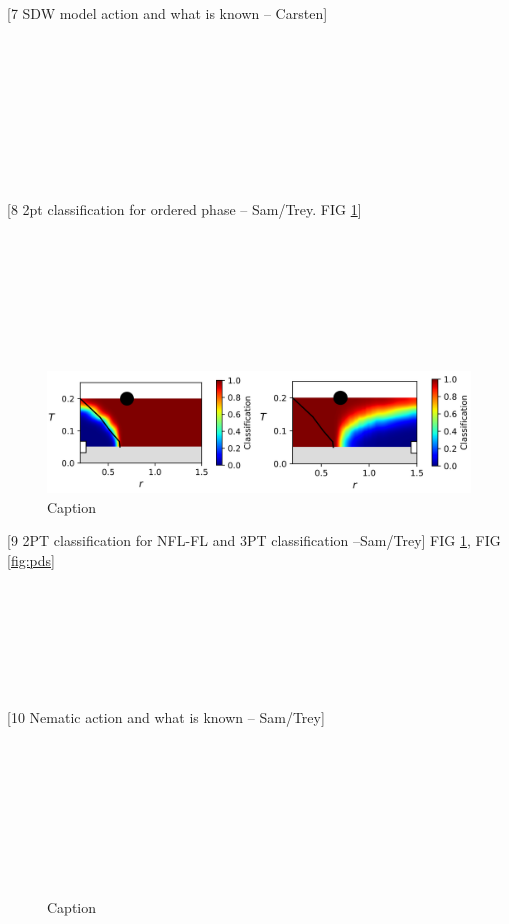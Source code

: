 \documentclass[amsmath,amssymb, aps, prx, longbibliography, twocolumn]{revtex4-1}
\begin{document}
[7 SDW model action and what is known -- Carsten]
\\
\\
\\
\\
\\
\\
\\
\\
\\
\\

[8 2pt classification for ordered phase -- Sam/Trey. FIG \ref{fig:2ptsdw}]
\\
\\
\\
\\
\\
\\
\\
\\
 \begin{figure} [t]
    \centering
\includegraphics[width=.45\textwidth]{2PT-SDW.png}
    \caption{Caption}
    \label{fig:2ptsdw}
\end{figure}

[9 2PT classification for NFL-FL and 3PT classification --Sam/Trey]
FIG \ref{fig:2ptsdw}, FIG \ref{fig:pds}
\\
\\
\\
\\
\\
\\
\\
\\




[10 Nematic action and what is known -- Sam/Trey]
\\
\\
\\
\\
\\
\\
\\
\\
\\

\begin{figure} [t]
    \centering

    \caption{Caption}
    \label{fig:2ptnem}
\end{figure}
\end{document}

